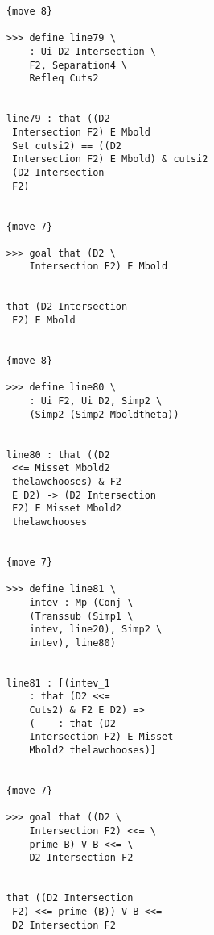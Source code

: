 \documentclass[12pt]{article}
\begin{document}
\begin{verbatim}
                        {move 8}

                        >>> define line79 \
                            : Ui D2 Intersection \
                            F2, Separation4 \
                            Refleq Cuts2


                        line79 : that ((D2 
                         Intersection F2) E Mbold 
                         Set cutsi2) == ((D2 
                         Intersection F2) E Mbold) & cutsi2 
                         (D2 Intersection 
                         F2)


                        {move 7}

                        >>> goal that (D2 \
                            Intersection F2) E Mbold


                        that (D2 Intersection 
                         F2) E Mbold


                        {move 8}

                        >>> define line80 \
                            : Ui F2, Ui D2, Simp2 \
                            (Simp2 (Simp2 Mboldtheta))


                        line80 : that ((D2 
                         <<= Misset Mbold2 
                         thelawchooses) & F2 
                         E D2) -> (D2 Intersection 
                         F2) E Misset Mbold2 
                         thelawchooses


                        {move 7}

                        >>> define line81 \
                            intev : Mp (Conj \
                            (Transsub (Simp1 \
                            intev, line20), Simp2 \
                            intev), line80)


                        line81 : [(intev_1 
                            : that (D2 <<= 
                            Cuts2) & F2 E D2) => 
                            (--- : that (D2 
                            Intersection F2) E Misset 
                            Mbold2 thelawchooses)]


                        {move 7}

                        >>> goal that ((D2 \
                            Intersection F2) <<= \
                            prime B) V B <<= \
                            D2 Intersection F2


                        that ((D2 Intersection 
                         F2) <<= prime (B)) V B <<= 
                         D2 Intersection F2



\end{verbatim}
\end{document}
